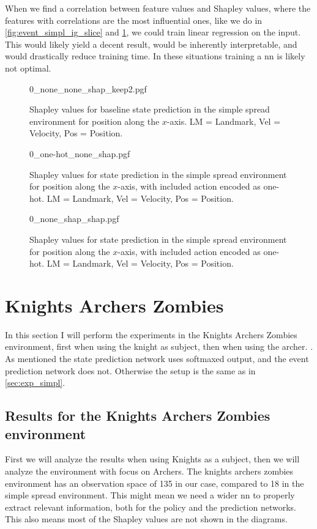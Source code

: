 \documentclass[UKenglish]{uiomasterthesis}
\begin{document}
When we find a correlation between feature values and Shapley values, where the features with correlations are the most influential ones, like we do in \cref{fig:event_simpl_ig_slice} and \cref{fig:state_simpl_shap}, we could train linear regression on the input. This would likely yield a decent result, would be inherently interpretable, and would drastically reduce training time. In these situations training a \ac{nn} is likely not optimal.

\begin{figure}[H]
    \centering
{0_none_none_shap_keep2.pgf}
\caption{Shapley values for baseline state prediction in the simple spread environment for position along the $x$-axis. LM = Landmark, Vel = Velocity, Pos = Position.}
\label{fig:state_simpl_shap}
\end{figure}

\begin{figure}[H]
\centering
{0_one-hot_none_shap.pgf}
\caption{Shapley values for state prediction in the simple spread environment for position along the $x$-axis, with included action encoded as one-hot. LM = Landmark, Vel = Velocity, Pos = Position.}
\label{fig:state_simpl_one-hot}
\end{figure}

\begin{figure}[H]
\centering
{0_none_shap_shap.pgf}
\caption{Shapley values for state prediction in the simple spread environment for position along the $x$-axis, with included action encoded as one-hot. LM = Landmark, Vel = Velocity, Pos = Position.}
\label{fig:state_simpl_shap_shap}
\end{figure}

\section{Knights Archers Zombies}
In this section I will perform the experiments in the Knights Archers Zombies environment, first when using the knight as subject, then when using the archer.
\label{sec:exp_kaz}. As mentioned the state prediction network uses softmaxed output, and the event prediction network does not. Otherwise the setup is the same as in \cref{sec:exp_simpl}.

\subsection{Results for the Knights Archers Zombies environment}
First we will analyze the results when using Knights as a subject, then we will analyze the environment with focus on Archers. The knights archers zombies environment has an observation space of 135 in our case, compared to 18 in the simple spread environment. This might mean we need a wider \ac{nn} to properly extract relevant information, both for the policy and the prediction networks. This also means most of the Shapley values are not shown in the diagrams.
\end{document}
